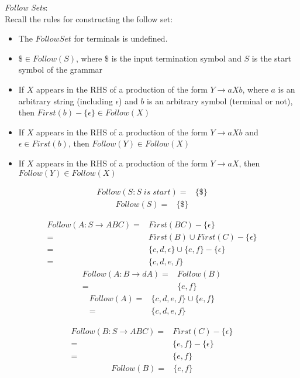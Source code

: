 \documentclass[fleqn]{article}
\begin{document}
\begin{enumerate}
  \textit{Follow Sets}:\\
  Recall the rules for constructing the follow set:
  \begin{itemize}
    \item The $Follow Set$ for terminals is undefined.
    \item $\$ \in Follow(S)$, where $\$$ is the input termination symbol and $S$ is the start symbol of the grammar
    \item If $X$ appears in the RHS of a production of the form $Y \rightarrow aXb$, where $a$ is an arbitrary string (including $\epsilon$) and $b$ is an arbitrary symbol (terminal or not), then $First(b) - \{\epsilon\} \in Follow(X)$
    \item If $X$ appears in the RHS of a production of the form $Y \rightarrow aXb$ and $\epsilon \in First(b)$, then $Follow(Y) \in Follow(X)$
    \item If $X$ appears in the RHS of a production of the form $Y \rightarrow aX$, then $Follow(Y) \in Follow(X)$
  \end{itemize}
  \begin{align*}
    Follow(S: S \; is \; start) =& \{\$\}
  \end{align*}
  \begin{align*}
    Follow(S) =& \{\$\}
  \end{align*}

  \begin{align*}
    Follow(A: S \rightarrow ABC) =& First(BC) - \{\epsilon\}\\
                                 =& First(B) \cup First(C) - \{\epsilon\}\\
                                 =& \{c, d, \epsilon\} \cup \{e, f\} - \{\epsilon\}\\
                                 =& \{c, d, e, f\}
  \end{align*}
  \begin{align*}
    Follow(A: B \rightarrow dA) =& Follow(B)\\
                                =& \{e, f\}
  \end{align*}
  \begin{align*}
    Follow(A) =& \{c, d, e, f\} \cup \{e, f\}\\
              =& \{c, d, e, f\}
  \end{align*}

  \begin{align*}
    Follow(B: S \rightarrow ABC) =& First(C) - \{\epsilon\}\\
                                 =& \{e, f\} - \{\epsilon\}\\
                                 =& \{e, f\}
  \end{align*}
  \begin{align*}
    Follow(B) =& \{e, f\}
  \end{align*}


\end{enumerate}
\end{document}
